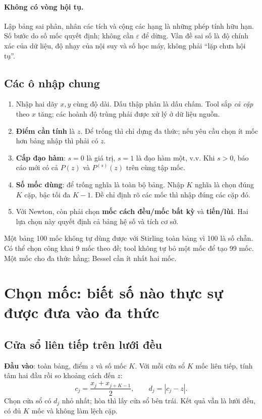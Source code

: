 \paragraph{Không có vòng hội tụ.} Lập bảng sai phân, nhân các tích và cộng các hạng là những phép tính hữu hạn. Số bước do số mốc quyết định; không cần $\varepsilon$ để dừng. Vấn đề sai số là độ chính xác của dữ liệu, độ nhạy của nội suy và số học máy, không phải ``lặp chưa hội tụ''.

\subsection{Các ô nhập chung}
\begin{enumerate}
\item Nhập hai dãy $x,y$ cùng độ dài. Dấu thập phân là dấu chấm. Tool sắp \emph{cả cặp} theo $x$ tăng; các hoành độ trùng phải được xử lý ở dữ liệu nguồn.
\item \textbf{Điểm cần tính} là $z$. Để trống thì chỉ dựng đa thức; nếu yêu cầu chọn ít mốc hơn bảng nhập thì phải có $z$.
\item \textbf{Cấp đạo hàm}: $s=0$ là giá trị, $s=1$ là đạo hàm một, v.v. Khi $s>0$, báo cáo mới có cả $P(z)$ và $P^{(s)}(z)$ trên cùng tập mốc.
\item \textbf{Số mốc dùng}: để trống nghĩa là toàn bộ bảng. Nhập $K$ nghĩa là chọn đúng $K$ cặp, bậc tối đa $K-1$. Đề chỉ định rõ các mốc thì nhập đúng các cặp đó.
\item Với Newton, còn phải chọn \textbf{mốc cách đều/mốc bất kỳ} và \textbf{tiến/lùi}. Hai lựa chọn này quyết định cả bảng hệ số và tích cơ sở.
\end{enumerate}

Một bảng 100 mốc không tự dùng được với Stirling toàn bảng vì 100 là số chẵn. Có thể chọn công khai 9 mốc theo đề; tool không tự bỏ một mốc để tạo 99 mốc. Một mốc cho đa thức hằng; Bessel cần ít nhất hai mốc.

\section{Chọn mốc: biết số nào thực sự được đưa vào đa thức}
\label{sec:node-selection}

\subsection{Cửa sổ liên tiếp trên lưới đều}
\textbf{Đầu vào}: toàn bảng, điểm $z$ và số mốc $K$. Với mỗi cửa sổ $K$ mốc liên tiếp, tính tâm hai đầu rồi so khoảng cách đến $z$:
\[
 c_j=\frac{x_j+x_{j+K-1}}2,\qquad d_j=|c_j-z|.
\]
Chọn cửa sổ có $d_j$ nhỏ nhất; hòa thì lấy cửa sổ bên trái. Kết quả vẫn là lưới đều, có đủ $K$ mốc và không làm lệch cặp.

